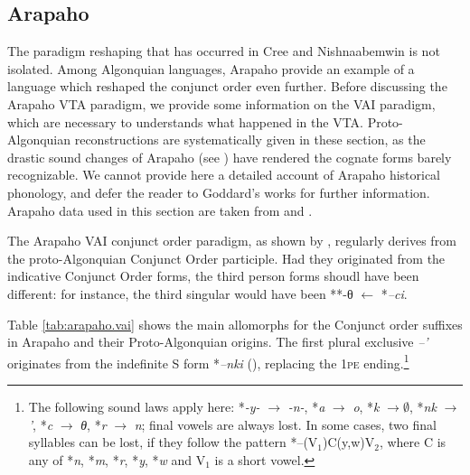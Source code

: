 \documentclass[twoside,a4paper,11pt]{article}
\newcommand{\ipa}[1]{{\phon\textit{#1}}}
\newcommand{\Σ}{\greek{Σ}}
\begin{document}
\subsection{Arapaho}

The paradigm reshaping that has occurred in Cree and Nishnaabemwin is not isolated. Among Algonquian languages, Arapaho provide an example of a language which reshaped the conjunct order even further. Before discussing the Arapaho VTA paradigm, we provide some information on the VAI   paradigm, which are necessary to understands what happened in the VTA. Proto-Algonquian reconstructions are systematically given in these section, as the drastic sound changes of Arapaho (see \citealt{goddard74arapaho}) have rendered the cognate forms barely recognizable. We cannot provide here a detailed account of Arapaho historical phonology, and defer the reader to Goddard's works for further information. Arapaho data used in this section are taken from \citet{salzmann67arapaho.verb} and \citet{cowell06arapaho}.

The Arapaho VAI conjunct order paradigm, as shown by \citet[16-7]{goddard65arapaho}, regularly derives from the proto-Algonquian Conjunct Order participle. Had they originated from the indicative Conjunct Order forms, the third person forms shoudl have been different: for instance, the third singular would have been **-θ $\leftarrow$ *\ipa{--ci}.

Table \ref{tab:arapaho.vai} shows the main  allomorphs for the Conjunct order suffixes in Arapaho and their Proto-Algonquian origins. The first plural exclusive \ipa{--'} originates from the indefinite S form *\ipa{--nki} (\citealt{goddard98morphology.arapaho}), replacing the \textsc{1pe} ending.\footnote{The following sound laws apply here: *\ipa{-y-} $\rightarrow$ \ipa{-n-}, *\ipa{a} $\rightarrow$ \ipa{o}, *\ipa{k} $\rightarrow \emptyset $, *\ipa{nk} $\rightarrow$ \ipa{'}, *\ipa{c} $\rightarrow$ \ipa{θ},  *\ipa{r} $\rightarrow$ \ipa{n}; final vowels are always lost. In some cases, two final syllables can be lost, if they follow the pattern *--(V${_1}$)C(y,w)V${_2}$, where C is any of *\ipa{n}, *\ipa{m}, *\ipa{r}, *\ipa{y}, *\ipa{w} and V${_1}$ is a short vowel. }

\end{document}
